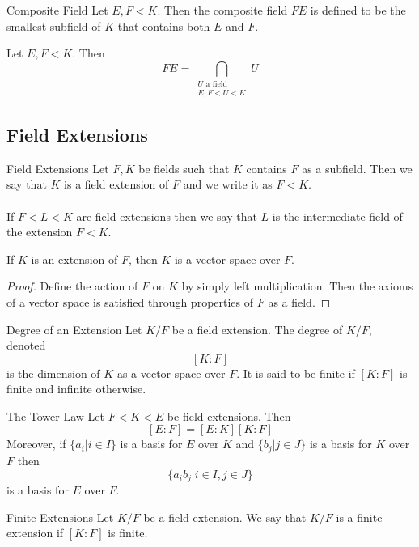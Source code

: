 \documentclass[a4paper]{article}
\begin{document}
\begin{defn}{Composite Field}{} Let $E,F<K$. Then the composite field $FE$ is defined to be the smallest subfield of $K$ that contains both $E$ and $F$. 
\end{defn}

\begin{prp}{}{} Let $E,F<K$. Then $$FE=\bigcap_{\substack{U\text{ a field}\\E,F<U<K}}U$$
\end{prp}

\subsection{Field Extensions}
\begin{defn}{Field Extensions}{} Let $F,K$ be fields such that $K$ contains $F$ as a subfield. Then we say that $K$ is a field extension of $F$ and we write it as $F<K$. \\~\\
If $F<L<K$ are field extensions then we say that $L$ is the intermediate field of the extension $F<K$. 
\end{defn}

\begin{prp}{}{} If $K$ is an extension of $F$, then $K$ is a vector space over $F$. \tcbline
\begin{proof}
Define the action of $F$ on $K$ by simply left multiplication. Then the axioms of a vector space is satisfied through properties of $F$ as a field. 
\end{proof}
\end{prp}

\begin{defn}{Degree of an Extension}{} Let $K/F$ be a field extension. The degree of $K/F$, denoted $$[K:F]$$ is the dimension of $K$ as a vector space over $F$. It is said to be finite if $[K:F]$ is finite and infinite otherwise. 
\end{defn}

\begin{prp}{The Tower Law}{} Let $F<K<E$ be field extensions. Then $$[E:F]=[E:K][K:F]$$ Moreover, if $\{a_i|i\in I\}$ is a basis for $E$ over $K$ and $\{b_j|j\in J\}$ is a basis for $K$ over $F$ then $$\{a_ib_j|i\in I, j\in J\}$$ is a basis for $E$ over $F$. 
\end{prp}

\begin{defn}{Finite Extensions}{} Let $K/F$ be a field extension. We say that $K/F$ is a finite extension if $[K:F]$ is finite. 
\end{defn}
\end{document}
